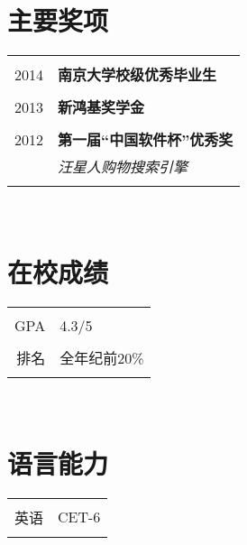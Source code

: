 \documentclass[10pt]{article} %
\begin{document}
\begin{minipage}[t]{0.32\textwidth}

\section{主要奖项} 

\begin{tabular}{rl}
& \\
2014  & \textbf{南京大学校级优秀毕业生}\\
& \\
2013  & \textbf{新鸿基奖学金}\\
& \\
2012	 & \textbf{第一届“中国软件杯”优秀奖}\\
& \textit{汪星人购物搜索引擎}\\ 
& \\
\end{tabular}\\[10pt]



\section{在校成绩} 

\begin{tabular}{rl}
& \\
\textsc{GPA}
& 4.3/5 \\
& \\
\textsc{排名}
& 全年纪前20\% \\
& \\
\end{tabular}\\[10pt]


\section{语言能力} 

\begin{tabular}{rl}
& \\
\textsc{英语}
& CET-6 \\
& \\
\end{tabular}\\[10pt]


\end{minipage}
\end{document}
